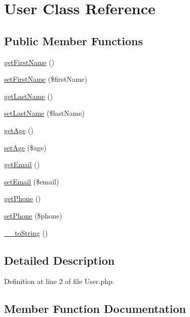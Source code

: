 \hypertarget{class_user}{}\section{User Class Reference}
\label{class_user}
\subsection*{Public Member Functions}
\begin{DoxyCompactItemize}
\item 
\hyperlink{class_user_a1797d3f80cc25452b4e97232ef14c6be}{get\+First\+Name} ()
\item 
\hyperlink{class_user_a3c626d0aca50df67aa89793615b7ffd1}{set\+First\+Name} (\$first\+Name)
\item 
\hyperlink{class_user_af0efc9a6afcaf0774ef627dbc4dbe43e}{get\+Last\+Name} ()
\item 
\hyperlink{class_user_acbe8bdd002179a3bc115ec7a9afb7e0b}{set\+Last\+Name} (\$last\+Name)
\item 
\hyperlink{class_user_a5a62afd4ce8cd694d7737b9ebbdd51d7}{get\+Age} ()
\item 
\hyperlink{class_user_a2c89f54beabff9157106c24878b70bca}{set\+Age} (\$age)
\item 
\hyperlink{class_user_acf082b95b344df14b9e8a6c09868dbcd}{get\+Email} ()
\item 
\hyperlink{class_user_a018ae17e436e09134922835cdd3235a7}{set\+Email} (\$email)
\item 
\hyperlink{class_user_acbf53279af16610c85d5f355860dd42b}{get\+Phone} ()
\item 
\hyperlink{class_user_a81a82307eef393fb41f0b3b76375472c}{set\+Phone} (\$phone)
\item 
\hyperlink{class_user_ab3d7e8f713f819b4121fb0bc38523c12}{\+\_\+\+\_\+to\+String} ()
\end{DoxyCompactItemize}


\subsection{Detailed Description}


Definition at line 2 of file User.\+php.



\subsection{Member Function Documentation}
\hypertarget{class_user_ab3d7e8f713f819b4121fb0bc38523c12}{}\label{class_user_ab3d7e8f713f819b4121fb0bc38523c12} 
